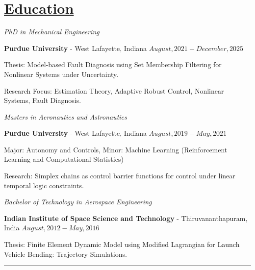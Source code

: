 \section*{\underline{Education}}

\noindent \textit{PhD in Mechanical Engineering}

\textbf{Purdue University} - West Lafayette, Indiana \hfill $August, 2021 - December, 2025$

Thesis: Model-based Fault Diagnosis using Set Membership Filtering for Nonlinear Systems under Uncertainty.

Research Focus: Estimation Theory, Adaptive Robust Control, Nonlinear Systems, Fault Diagnosis.

\medskip

\noindent \textit{Masters in Aeronautics and Astronautics}

\textbf{Purdue University} - West Lafayette, Indiana \hfill $August, 2019 - May, 2021$

Major: Autonomy and Controls, Minor: Machine Learning (Reinforcement Learning and Computational Statistics)

Research: Simplex chains as control barrier functions for control under linear temporal logic constraints.

\medskip

\noindent \textit{Bachelor of Technology in Aerospace Engineering }

\textbf{Indian Institute of Space Science and Technology} - Thiruvananthapuram, India \hfill $ August, 2012 - May, 2016 $

Thesis: Finite Element Dynamic Model using Modified Lagrangian for Launch Vehicle Bending: Trajectory Simulations.
\noindent\rule{\textwidth}{0.4pt}
